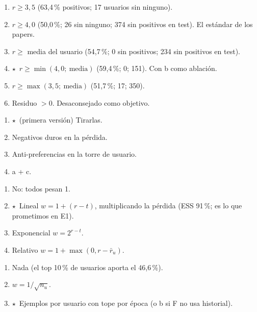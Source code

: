 \documentclass[a4paper,11pt]{article}
\newcommand{\rec}{\ensuremath{\star}}
\begin{document}
\begin{enumerate}[label=\alph*)]
  \item $r\ge3{,}5$ (63,4\,\% positivos; 17 usuarios sin ninguno).
  \item $r\ge4{,}0$ (50,0\,\%; 26 sin ninguno; 374 sin positivos en test). El estándar de los papers.
  \item $r\ge$ media del usuario (54,7\,\%; 0 sin positivos; 234 sin positivos en test).
  \item \rec\ $r\ge\min(4{,}0;\ \text{media})$ (59,4\,\%; 0; 151). Con b como ablación.
  \item $r\ge\max(3{,}5;\ \text{media})$ (51,7\,\%; 17; 350).
  \item Residuo $>0$. Desaconsejado como objetivo.
\end{enumerate}

\begin{enumerate}[label=\alph*)]
  \item \rec\ (primera versión) Tirarlas.
  \item Negativos duros en la pérdida.
  \item Anti-preferencias en la torre de usuario.
  \item a + c.
\end{enumerate}

\begin{enumerate}[label=\alph*)]
  \item No: todos pesan 1.
  \item \rec\ Lineal $w=1+(r-t)$, multiplicando la pérdida (ESS 91\,\%; es lo que prometimos en E1).
  \item Exponencial $w=2^{r-t}$.
  \item Relativo $w=1+\max(0,r-\bar r_u)$.
\end{enumerate}

\begin{enumerate}[label=\alph*)]
  \item Nada (el top 10\,\% de usuarios aporta el 46,6\,\%).
  \item $w=1/\sqrt{n_u}$.
  \item \rec\ Ejemplos por usuario con tope por época (o b si F no usa historial).
\end{enumerate}
\end{document}
